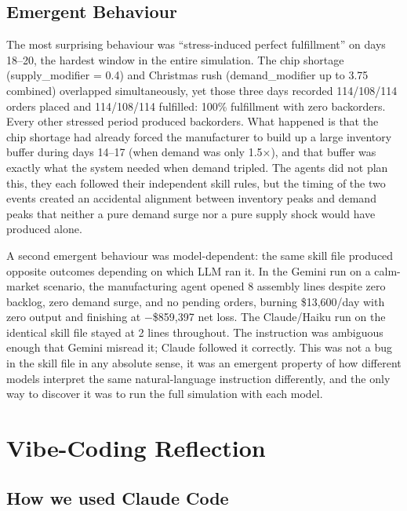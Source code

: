\documentclass[
]{article}
\begin{document}
\subsection{Emergent Behaviour}\label{emergent-behaviour}

The most surprising behaviour was ``stress-induced perfect fulfillment''
on days 18--20, the hardest window in the entire simulation. The chip
shortage (supply\_modifier = 0.4) and Christmas rush (demand\_modifier
up to 3.75 combined) overlapped simultaneously, yet those three days
recorded 114/108/114 orders placed and 114/108/114 fulfilled: 100\%
fulfillment with zero backorders. Every other stressed period produced
backorders. What happened is that the chip shortage had already forced
the manufacturer to build up a large inventory buffer during days 14--17
(when demand was only 1.5×), and that buffer was exactly what the system
needed when demand tripled. The agents did not plan this, they each
followed their independent skill rules, but the timing of the two events
created an accidental alignment between inventory peaks and demand peaks
that neither a pure demand surge nor a pure supply shock would have
produced alone.

A second emergent behaviour was model-dependent: the same skill file
produced opposite outcomes depending on which LLM ran it. In the Gemini
run on a calm-market scenario, the manufacturing agent opened 8 assembly
lines despite zero backlog, zero demand surge, and no pending orders,
burning \$13,600/day with zero output and finishing at $-$\$859,397 net
loss. The Claude/Haiku run on the identical skill file stayed at 2 lines
throughout. The instruction was ambiguous enough that Gemini misread it;
Claude followed it correctly. This was not a bug in the skill file in
any absolute sense, it was an emergent property of how different models
interpret the same natural-language instruction differently, and the
only way to discover it was to run the full simulation with each model.



\section{Vibe-Coding Reflection}\label{d-vibe-coding-reflection}

\subsection{How we used Claude Code}\label{how-we-used-claude-code}
\end{document}
